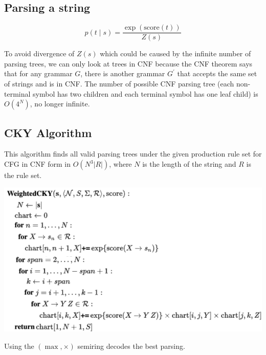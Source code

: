 \subsection*{Parsing a string}

\vspace{-0.4cm}
$$p(t\mid s) = \frac{\exp(\text{score}(t))}{Z(s)}$$
\vspace{-0.4cm}

To avoid divergence of $Z(s)$ which could be caused by the infinite number of parsing trees, we can only look at trees in CNF because the CNF theorem says that for any grammar $G$, there is another grammar $G^\prime$ that accepts the same set of strings and is in CNF. The number of possible CNF parsing tree (each non-terminal symbol has two children and each terminal symbol has one leaf child) is $O(4^N)$, no longer infinite.

\subsection*{CKY Algorithm}

This algorithm finds all valid parsing trees under the given production rule set for CFG in CNF form in $O(N^3 |R|)$, where $N$ is the length of the string and $R$ is the rule set.

\vspace{-0.4cm}
\begin{center}
    \includegraphics[width=\columnwidth]{img/CKY.png}
\end{center}
\vspace{-0.4cm}

Using the $(\max, \times)$ semiring decodes the best parsing.
